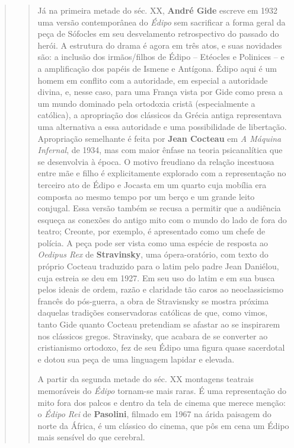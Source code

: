 \begin{verse}
\begin{verse}
Já na primeira metade do séc. XX, \textbf{André Gide} escreve em 1932
uma versão contemporânea do \emph{Édipo} sem sacrificar a forma geral da
peça de Sófocles em seu desvelamento retrospectivo do passado do herói.
A estrutura do drama é agora em três atos, e suas novidades são: a
inclusão dos irmãos/filhos de Édipo -- Etéocles e Polinices -- e a
amplificação dos papéis de Ismene e Antígona. Édipo aqui é um homem em
conflito com a autoridade, em especial a autoridade divina, e, nesse
caso, para uma França vista por Gide como presa a um mundo dominado pela
ortodoxia cristã (especialmente a católica), a apropriação dos clássicos
da Grécia antiga representava uma alternativa a essa autoridade e uma
possibilidade de libertação. Apropriação semelhante é feita por
\textbf{Jean Cocteau} em \emph{A Máquina Infernal}, de 1934, mas com
maior ênfase na teoria psicanalítica que se desenvolvia à época. O
motivo freudiano da relação incestuosa entre mãe e filho é
explicitamente explorado com a representação no terceiro ato de Édipo e
Jocasta em um quarto cuja mobília era composta ao mesmo tempo por um
berço e um grande leito conjugal. Essa versão também se recusa a
permitir que a audiência esqueça as conexões do antigo mito com o mundo
do lado de fora do teatro; Creonte, por exemplo, é apresentado como um
chefe de polícia. A peça pode ser vista como uma espécie de resposta ao
\emph{Oedipus Rex} de \textbf{Stravinsky}, uma ópera-oratório, com texto
do próprio Cocteau traduzido para o latim pelo padre Jean Daniélou, cuja
estreia se deu em 1927. Em seu uso do latim e em sua busca pelos ideais
de ordem, razão e claridade tão caros ao neoclassicismo francês do
pós-guerra, a obra de Stravisnsky se mostra próxima daquelas tradições
conservadoras católicas de que, como vimos, tanto Gide quanto Cocteau
pretendiam se afastar ao se inspirarem nos clássicos gregos. Stravinsky,
que acabara de se converter ao cristianismo ortodoxo, fez de seu Édipo
uma figura quase sacerdotal e dotou sua peça de uma linguagem lapidar e
elevada.

A partir da segunda metade do séc. XX montagens teatrais memoráveis do
\emph{Édipo} tornam-se mais raras. É uma representação do mito fora dos
palcos e dentro da tela de cinema que merece menção: o \emph{Édipo Rei}
de \textbf{Pasolini}, filmado em 1967 na árida paisagem do norte da
África, é um clássico do cinema, que pôs em cena um Édipo mais sensível
do que cerebral.


\end{verse}
\end{verse}
